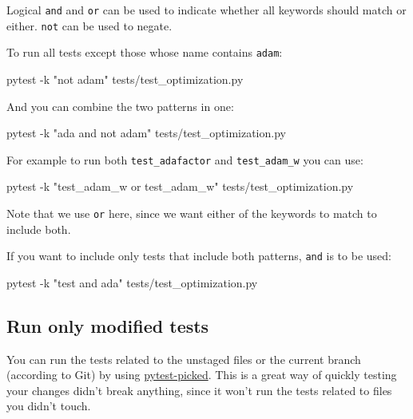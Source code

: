 \documentclass[
]{report}
\newenvironment{Shaded}{\begin{snugshade}}{\end{snugshade}}
\newcommand{\AttributeTok}[1]{\textcolor[rgb]{0.40,0.45,0.13}{#1}}
\newcommand{\ExtensionTok}[1]{\textcolor[rgb]{0.00,0.23,0.31}{#1}}
\newcommand{\NormalTok}[1]{\textcolor[rgb]{0.00,0.23,0.31}{#1}}
\newcommand{\StringTok}[1]{\textcolor[rgb]{0.13,0.47,0.30}{#1}}
\begin{document}
Logical \texttt{and} and \texttt{or} can be used to indicate whether all
keywords should match or either. \texttt{not} can be used to negate.

To run all tests except those whose name contains \texttt{adam}:

\begin{Shaded}
\begin{Highlighting}[]
\ExtensionTok{pytest} \AttributeTok{{-}k} \StringTok{"not adam"}\NormalTok{ tests/test\_optimization.py}
\end{Highlighting}
\end{Shaded}

And you can combine the two patterns in one:

\begin{Shaded}
\begin{Highlighting}[]
\ExtensionTok{pytest} \AttributeTok{{-}k} \StringTok{"ada and not adam"}\NormalTok{ tests/test\_optimization.py}
\end{Highlighting}
\end{Shaded}

For example to run both \texttt{test\_adafactor} and
\texttt{test\_adam\_w} you can use:

\begin{Shaded}
\begin{Highlighting}[]
\ExtensionTok{pytest} \AttributeTok{{-}k} \StringTok{"test\_adam\_w or test\_adam\_w"}\NormalTok{ tests/test\_optimization.py}
\end{Highlighting}
\end{Shaded}

Note that we use \texttt{or} here, since we want either of the keywords
to match to include both.

If you want to include only tests that include both patterns,
\texttt{and} is to be used:

\begin{Shaded}
\begin{Highlighting}[]
\ExtensionTok{pytest} \AttributeTok{{-}k} \StringTok{"test and ada"}\NormalTok{ tests/test\_optimization.py}
\end{Highlighting}
\end{Shaded}

\subsection{Run only modified tests}\label{run-only-modified-tests}

You can run the tests related to the unstaged files or the current
branch (according to Git) by using
\href{https://github.com/anapaulagomes/pytest-picked}{pytest-picked}.
This is a great way of quickly testing your changes didn't break
anything, since it won't run the tests related to files you didn't
touch.
\end{document}
